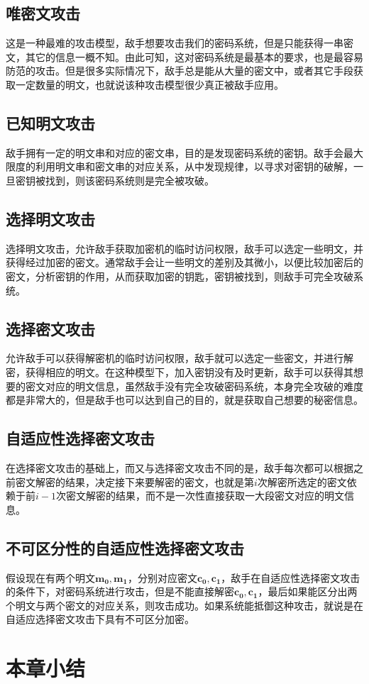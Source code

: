 \subsection{唯密文攻击}
这是一种最难的攻击模型，敌手想要攻击我们的密码系统，但是只能获得一串密文，其它的信息一概不知。由此可知，这对密码系统是最基本的要求，也是最容易防范的攻击。但是很多实际情况下，敌手总是能从大量的密文中，或者其它手段获取一定数量的明文，也就说该种攻击模型很少真正被敌手应用。

\subsection{已知明文攻击}
敌手拥有一定的明文串和对应的密文串，目的是发现密码系统的密钥。敌手会最大限度的利用明文串和密文串的对应关系，从中发现规律，以寻求对密钥的破解，一旦密钥被找到，则该密码系统则是完全被攻破。

\subsection{选择明文攻击}
选择明文攻击，允许敌手获取加密机的临时访问权限，敌手可以选定一些明文，并获得经过加密的密文。通常敌手会让一些明文的差别及其微小，以便比较加密后的密文，分析密钥的作用，从而获取加密的钥匙，密钥被找到，则敌手可完全攻破系统。

\subsection{选择密文攻击}
允许敌手可以获得解密机的临时访问权限，敌手就可以选定一些密文，并进行解密，获得相应的明文。在这种模型下，加入密钥没有及时更新，敌手可以获得其想要的密文对应的明文信息，虽然敌手没有完全攻破密码系统，本身完全攻破的难度都是非常大的，但是敌手也可以达到自己的目的，就是获取自己想要的秘密信息。

\subsection{自适应性选择密文攻击}
在选择密文攻击的基础上，而又与选择密文攻击不同的是，敌手每次都可以根据之前密文解密的结果，决定接下来要解密的密文，也就是第$i$次解密所选定的密文依赖于前$i - 1$次密文解密的结果，而不是一次性直接获取一大段密文对应的明文信息。

\subsection{不可区分性的自适应性选择密文攻击}
假设现在有两个明文$\mathbf{m_0},\mathbf{m_1}$，分别对应密文$\mathbf{c_0},\mathbf{c_1}$，敌手在自适应性选择密文攻击的条件下，对密码系统进行攻击，但是不能直接解密$\mathbf{c_0},\mathbf{c_1}$，最后如果能区分出两个明文与两个密文的对应关系，则攻击成功。如果系统能抵御这种攻击，就说是在自适应选择密文攻击下具有不可区分加密。

\section{本章小结}